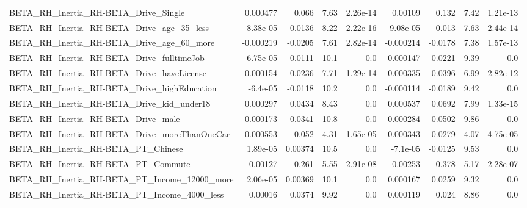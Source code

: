 \begin{tabular}{lrrrrrrrr}
BETA\_RH\_Inertia\_RH-BETA\_Drive\_Single               &    0.000477 &        0.066 &     7.63 & 2.26e-14 &    0.00109 &       0.132 &         7.42 &      1.21e-13 \\
BETA\_RH\_Inertia\_RH-BETA\_Drive\_age\_35\_less          &    8.38e-05 &       0.0136 &     8.22 & 2.22e-16 &   9.08e-05 &       0.013 &         7.63 &      2.44e-14 \\
BETA\_RH\_Inertia\_RH-BETA\_Drive\_age\_60\_more          &   -0.000219 &      -0.0205 &     7.61 & 2.82e-14 &  -0.000214 &     -0.0178 &         7.38 &      1.57e-13 \\
BETA\_RH\_Inertia\_RH-BETA\_Drive\_fulltimeJob          &   -6.75e-05 &      -0.0111 &     10.1 &      0.0 &  -0.000147 &     -0.0221 &         9.39 &           0.0 \\
BETA\_RH\_Inertia\_RH-BETA\_Drive\_haveLicense          &   -0.000154 &      -0.0236 &     7.71 & 1.29e-14 &   0.000335 &      0.0396 &         6.99 &      2.82e-12 \\
BETA\_RH\_Inertia\_RH-BETA\_Drive\_highEducation        &    -6.4e-05 &      -0.0118 &     10.2 &      0.0 &  -0.000114 &     -0.0189 &         9.42 &           0.0 \\
BETA\_RH\_Inertia\_RH-BETA\_Drive\_kid\_under18          &    0.000297 &       0.0434 &     8.43 &      0.0 &   0.000537 &      0.0692 &         7.99 &      1.33e-15 \\
BETA\_RH\_Inertia\_RH-BETA\_Drive\_male                 &   -0.000173 &      -0.0341 &     10.8 &      0.0 &  -0.000284 &     -0.0502 &         9.86 &           0.0 \\
BETA\_RH\_Inertia\_RH-BETA\_Drive\_moreThanOneCar       &    0.000553 &        0.052 &     4.31 & 1.65e-05 &   0.000343 &      0.0279 &         4.07 &      4.75e-05 \\
BETA\_RH\_Inertia\_RH-BETA\_PT\_Chinese                 &    1.89e-05 &      0.00374 &     10.5 &      0.0 &   -7.1e-05 &     -0.0125 &         9.53 &           0.0 \\
BETA\_RH\_Inertia\_RH-BETA\_PT\_Commute                 &     0.00127 &        0.261 &     5.55 & 2.91e-08 &    0.00253 &       0.378 &         5.17 &      2.28e-07 \\
BETA\_RH\_Inertia\_RH-BETA\_PT\_Income\_12000\_more       &    2.06e-05 &      0.00369 &     10.1 &      0.0 &   0.000167 &      0.0259 &         9.32 &           0.0 \\
BETA\_RH\_Inertia\_RH-BETA\_PT\_Income\_4000\_less        &     0.00016 &       0.0374 &     9.92 &      0.0 &   0.000119 &       0.024 &         8.86 &           0.0 \\

\end{tabular}
